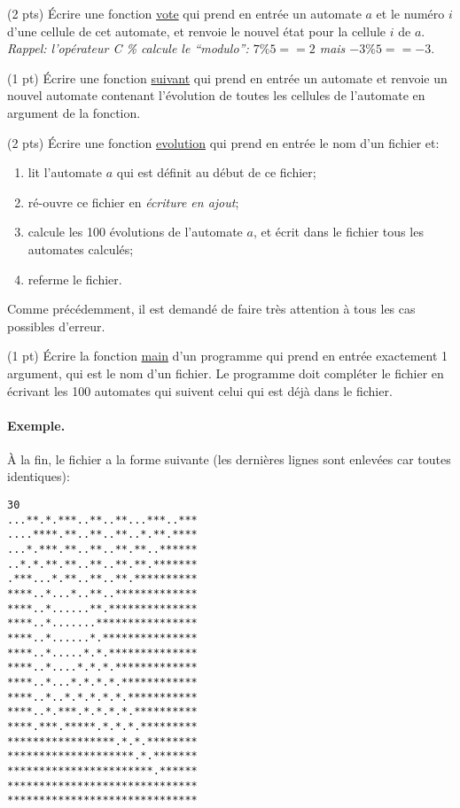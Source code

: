 \question (2 pts) {\'E}crire une fonction \url{vote} qui prend en entr{\'e}e
un automate $a$ et le num{\'e}ro $i$ d'une cellule de cet automate, et
renvoie le nouvel {\'e}tat pour la cellule $i$ de $a$. \textit{Rappel: 
l'op{\'e}rateur C \% calcule le ``modulo'': $7\% 5 == 2$  mais \(-3 \% 5 == -3\)}.




\question (1 pt) {\'E}crire une fonction \url{suivant} qui prend en
entr{\'e}e un automate et renvoie un nouvel automate contenant
l'évolution de toutes les cellules de l'automate en argument de la fonction.


\question (2 pts) {\'E}crire une fonction \url{evolution} qui prend en
entr{\'e}e le nom d'un fichier et:
\begin{enumerate}
\item lit l'automate $a$ qui est d{\'e}finit au d{\'e}but de ce fichier;
\item r{\'e}-ouvre ce fichier en \emph{{\'e}criture en ajout};
\item calcule les 100 {\'e}volutions de l'automate $a$, et {\'e}crit dans 
le fichier tous les automates calcul{\'e}s;
\item referme le fichier.
\end{enumerate}
Comme pr{\'e}c{\'e}demment, il est demand{\'e} de faire tr{\`e}s attention {\`a} tous les
cas possibles d'erreur.


\question (1 pt) {\'E}crire la fonction \url{main} d'un programme qui
prend en entr{\'e}e exactement 1 argument, qui est le nom d'un fichier. Le
programme doit compl{\'e}ter le fichier en {\'e}crivant les 100 automates qui
suivent celui qui est d{\'e}j{\`a} dans le fichier.

\paragraph{Exemple.} {\`A} la fin, le fichier a la forme suivante (les
derni{\`e}res lignes sont enlev{\'e}es car toutes identiques):

\begin{verbatim}
30
...**.*.***..**..**...***..***
....****.**..**..**..*.**.****
...*.***.**..**..**.**..******
..*.*.**.**..**..**.**.*******
.***...*.**..**..**.**********
****..*...*..**..*************
****..*......**.**************
****..*.......****************
****..*......*.***************
****..*.....*.*.**************
****..*....*.*.*.*************
****..*...*.*.*.*.************
****..*..*.*.*.*.*.***********
****..*.***.*.*.*.*.**********
****.***.*****.*.*.*.*********
*****************.*.*.********
********************.*.*******
***********************.******
******************************
******************************
\end{verbatim}

